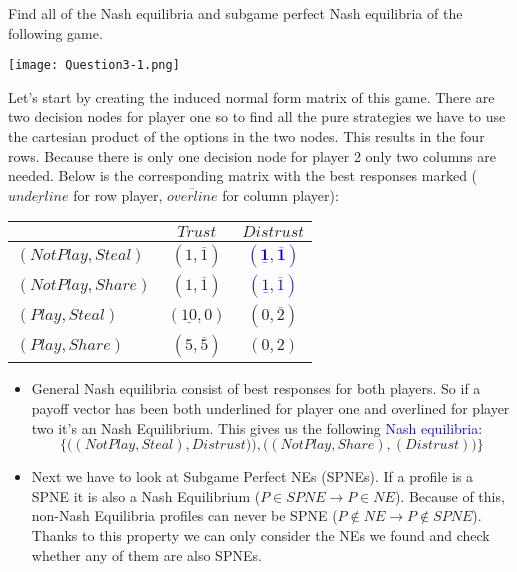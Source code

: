 \documentclass[../main.tex]{subfiles}
\begin{document}
\begin{question}
    Find all of the Nash equilibria and subgame perfect Nash equilibria of the following game.

    \centering
    \texttt{[image: Question3-1.png]}
\end{question}

\begin{solution} 
Let's start by creating the induced normal form matrix of this game. 
There are two decision nodes for player one so to find all the pure strategies we have to use the cartesian product of the options in the two nodes. This results in the four rows.
Because there is only one decision node for player 2 only two columns are needed.
Below is the corresponding matrix with the best responses marked ($\underline{underline}$ for row player, $\overline{overline}$ for column player): 
\begin{center}
	\setlength\extrarowheight{1pt} %
	\begin{tabular}{|l|c|c|}
		\hline
		& $Trust$ & $Distrust$ \\
		\hline
		$(Not Play,Steal)$ & $(1,\overline{1})$ & \textcolor{blue}{$\mathbf{(\underline{1},\overline{1})}$} \\
		\hline
		$(Not Play,Share)$ & $(1,\overline{1})$ & \textcolor{blue}{$(\underline{1},\overline{1})$} \\
		\hline
		$(Play,Steal)$ & $(\underline{10},0)$ & $(0,\overline{2})$ \\
		\hline
		$(Play,Share)$ & $(5,\overline{5})$ & $(0,2)$ \\
		\hline
	\end{tabular}
\end{center}
\begin{itemize}
	\item General Nash equilibria consist of best responses for both players. So if a payoff vector has been both underlined for player one and overlined for player two it's an Nash Equilibrium. This gives us the following \textcolor{blue}{Nash equilibria}: 
	$$\{\Big((Not Play, Steal),Distrust)\Big),\Big((Not Play, Share),(Distrust)\Big)\}$$
	\item Next we have to look at Subgame Perfect NEs (SPNEs).
		If a profile is a SPNE it is also a Nash Equilibrium ($P \in SPNE \rightarrow P \in NE$).
		Because of this, non-Nash Equilibria profiles can never be SPNE ($P \notin NE \rightarrow P \notin SPNE$). Thanks to this property we can only consider the NEs we found and check whether any of them are also SPNEs.

\end{itemize}
\end{solution}
\end{document}
